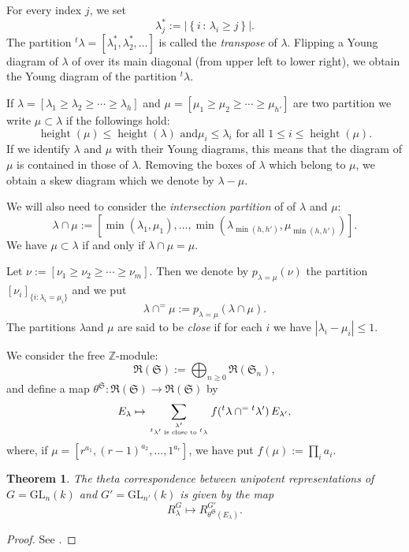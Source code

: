 \documentclass[12pt]{amsart}
\numberwithin{equation}{subsection}
\newtheorem{thm}[equation]{Theorem}
\newcommand{\ZZ}{\mathbb{Z}}
\newcommand{\height}{\operatorname{height}}
\newcommand{\fR}{\mathfrak{R}}
\newcommand{\fS}{\mathfrak{S}}
\newcommand{\GL}{\mathrm{GL}}
\begin{document}
For every index $j$, we set 
\begin{equation}
\lambda_j^\ast:= |\left\{i \,:\, \lambda_i \ge j\right\}|.
\end{equation} 
The partition ${}^t\lambda=[\lambda^\ast_1, \lambda^\ast_2, \ldots]$ is called  the \textit{transpose} of $\lambda$.
Flipping a Young diagram of  $\lambda$ of over its main diagonal (from upper left to lower right), we obtain the Young diagram of the partition ${}^t\lambda$.

If $\lambda=[\lambda_1\ge\lambda_2\ge\cdots\ge\lambda_h]$ and  $\mu=[\mu_1\ge\mu_2\ge\cdots\ge\mu_{h'}]$ are two partition we write $\mu\subset\lambda$ 
if the followings hold: 
\[\text{$\height(\mu)\le \height(\lambda)$ and
$\mu_i\le\lambda_i$  for all $1\le i\le\height(\mu)$.}\]
 If we identify $\lambda$ and $\mu$ with their Young diagrams, this means that the diagram of $\mu$ is contained in those of $\lambda$. Removing the boxes of $\lambda$ which belong to $\mu$, we obtain a skew diagram which we denote by 
 $\lambda-\mu$.
 
We will also need to consider the \textit{intersection partition} of of $\lambda$ and $\mu$:
\[\lambda\cap\mu:=[\min(\lambda_1,\mu_1), \ldots, \min(\lambda_{\min(h,h')}, \mu_{\min(h,h')})] .\]
We have $\mu\subset\lambda$ if and only if $\lambda\cap\mu=\mu$.

Let $\nu:=[\nu_1\ge \nu_2 \ge\cdots\ge \nu_{m}]$. Then we denote by $p_{\lambda=\mu}(\nu)$ the partition $[\nu_i]_{\{i:\lambda_i=\mu_i\}}$ and we put
\begin{equation}
\lambda\cap^{=}\mu:= p_{\lambda=\mu}(\lambda\cap\mu).
\end{equation}
The partitions $\lambda$and $\mu$  are said to be \textit{close} if for each $i$ we have $|\lambda_i -\mu_i| \le 1$.

We consider the free $\ZZ$-module:
\[\fR(\fS):=\bigoplus_{n\ge 0}\fR(\fS_n),\]
and define a map $\theta^{\fS}\colon \fR(\fS)\to \fR(\fS)$ by
\begin{equation}
E_{\lambda}\mapsto \sum_{\lambda'\atop
\text{${}^t\lambda'$ is close to ${}^t\lambda$}} f({}^t\lambda\cap^{=}{}^t\lambda')\,E_{\lambda'},
\end{equation}
where, if $\mu=[r^{a_1}, (r-1)^{a_2},\ldots, 1^{a_r}]$, we have put $f(\mu):=\prod_i a_i$.
\begin{thm}
The theta correspondence between unipotent representations of $G=\GL_n(k)$ and $G'=\GL_{n'}(k)$ is given by the map
\[R^G_\lambda\mapsto R^{G'}_{\theta^{\fS}(E_{\lambda})}.\]
\end{thm}
\begin{proof}
See \cite[Th\'eor\`eme~5.5]{AMR}.
\end{proof}
\end{document}
